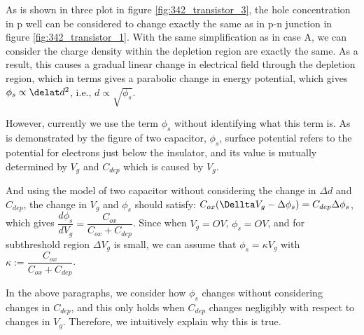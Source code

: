 As is shown in three plot in figure \ref{fig:342_transistor_3}, the hole concentration in p well can be considered to change exactly the same as in p-n junction in figure \ref{fig:342_transistor_1}. With the same simplification as in case A, we can consider the charge density within the depletion region are exactly the same. As a result, this causes a gradual linear change in electrical field through the depletion region, which in terms gives a parabolic change in energy potential, which gives \(\phi_{s} \propto \delat d^2 \), i.e., \(d \propto \sqrt{\phi_{s}}\). 


However, currently we use the term \(\phi_{s}\) without identifying what this term is. As is demonstrated by the figure of two capacitor, \(\phi_s\), surface potential refers to the potential for electrons just below the insulator, and its value is mutually determined by \(V_g\) and \(C_{dep}\) which is caused by \(V_g\). 

And using the model of two capacitor without considering the change in \(\Delta d\) and \(C_{dep}\), the change in \(V_g\) and \(\phi_s\) should satisfy: \(C_{ox}(\Dellta V_g - \Delta \phi_s) = C_{dep}\Delta \phi_s\), which gives \(\dfrac{d\phi_s}{dV_g} = \dfrac{C_{ox}}{C_{ox}+C_{dep}}\). Since when \(V_g = OV\), \(\phi_s = OV\), and for subthreshold region \(\Delta V_g\) is small, we can assume that \(\phi_s = \kappa V_g\) with \(\kappa := \dfrac{C_{ox}}{C_{ox}+C_{dep}}\). 

In the above paragraphs, we consider how \(\phi_s\) changes without considering changes in \(C_{dep}\), and this only holds when \(C_{dep}\) changes negligibly with respect to changes in \(V_g\). Therefore, we intuitively explain why this is true. 